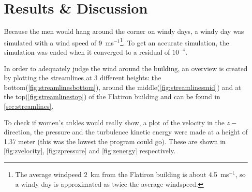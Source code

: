 \section{Results \& Discussion}
\label{sec:results}
Because the men would hang around the corner on windy days\cite{dresses}, a windy day was simulated with a wind speed of 9~ms$^{-1}$\footnote{The average windpeed 2~km from the Flatiron building is about 4.5~ms$^{-1}$\cite{windspeed}, so a windy day is approximated as twice the average windspeed.}. To get an accurate simulation, the simulation was ended when it converged to a residual of $10^{-4}$. 

In order to adequately judge the wind around the building, an overview is created by plotting the streamlines at 3 different heights: the bottom(\autoref{fig:streamlinesbottom}), around the middle(\autoref{fig:streamlinesmid}) and at the top(\autoref{fig:streamlinestop}) of the Flatiron building and can be found in \autoref{sec:streamlines}.

To check if women's ankles would really show, a plot of the velocity in the $z-$direction, the pressure and the turbulence kinetic energy were made at a height of 1.37 meter (this was the lowest the program could go). These are shown in \autoref{fig:zvelocity}, \ref{fig:zpressure} and \ref{fig:zenergy} respectively.

